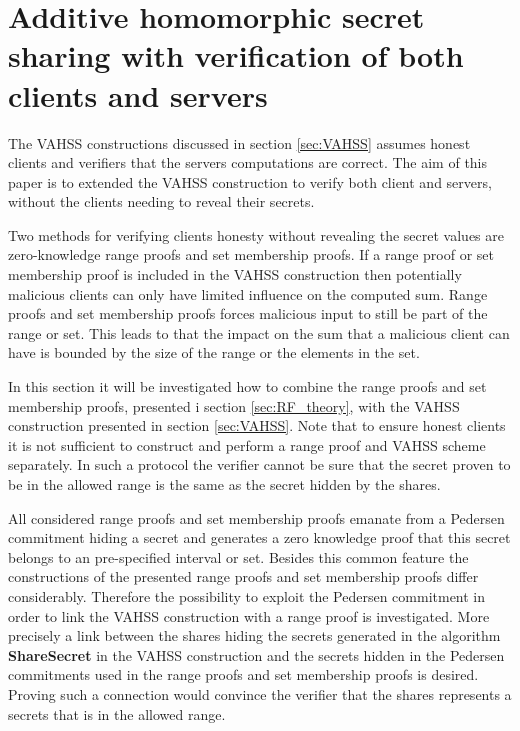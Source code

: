 \section{Additive homomorphic secret sharing with verification of both clients and servers }
\label{sec:combination}

The VAHSS constructions  discussed in section \ref{sec:VAHSS} assumes honest clients and verifiers that the servers computations are correct. The aim of this paper is to extended the VAHSS construction to verify both client and servers, without the clients needing to reveal their secrets. 

Two methods for verifying clients honesty without revealing the secret values  are zero-knowledge range proofs and set membership proofs. If a range proof or set membership proof is included in the VAHSS construction then potentially malicious clients can only have limited influence on the computed sum. Range proofs and set membership proofs forces malicious input to still be part of the range or set. This leads to that the impact on the sum that a malicious client can have is bounded by the size of the range or the elements in the set. 

In this section it will be investigated how to combine the range proofs and set membership proofs, presented i section \ref{sec:RF_theory}, with the VAHSS construction presented in section \ref{sec:VAHSS}. Note that to ensure honest clients it is  not sufficient to construct and perform a range proof and VAHSS scheme separately. In such a protocol the verifier cannot be sure that the secret proven to be in the allowed range is the same as the secret hidden by the shares.

All considered range proofs and set membership proofs emanate from a Pedersen commitment hiding a secret and generates a zero knowledge proof that this secret belongs to an pre-specified interval or set. Besides this common feature the constructions of the presented range proofs and set membership proofs differ considerably. Therefore the possibility to exploit the Pedersen commitment in order to link the VAHSS construction with a range proof is investigated. More precisely a link between the shares hiding the secrets generated in the algorithm \textbf{ShareSecret} in the VAHSS construction and the secrets hidden in the Pedersen commitments used in the range proofs and set membership proofs is desired. Proving such a connection would convince the verifier that the shares represents a secrets that is in the allowed range.  


